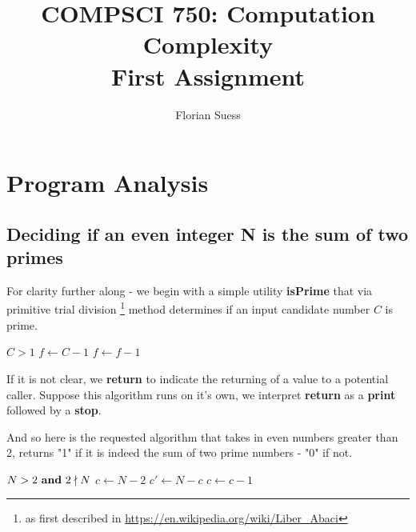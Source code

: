 \documentclass{article}
\title{COMPSCI 750: Computation Complexity \\ First Assignment}
\author{Florian Suess}
\begin{document}
\maketitle
\section{Program Analysis}
\subsection{Deciding if an even integer N is the sum of two primes}
For clarity further along - we begin with a simple utility \textbf{isPrime} that via primitive trial division \footnote{as first described in \url{https://en.wikipedia.org/wiki/Liber_Abaci}} method determines if an input candidate number $C$ is prime.

\vspace{1em}
\begin{algorithmic}[1]
	\REQUIRE $C > 1$
	\STATE $f \leftarrow C - 1$
		\ENDIF
		\STATE $f \leftarrow f - 1$
	\ENDWHILE
\end{algorithmic}
\vspace{1em}

If it is not clear, we \textbf{return} to indicate the returning of a value to a potential caller. Suppose this algorithm runs on it's own, we interpret \textbf{return} as a \textbf{print} followed by a \textbf{stop}.

\pagebreak

And so here is the requested algorithm that takes in even numbers greater than 2, returns "1" if it is indeed the sum of two prime numbers - "0" if not.

\vspace{1em}
\begin{algorithmic}[1]
	\REQUIRE $N > 2 \text{ \textbf{and} } 2 \nmid N$
	\STATE $c \leftarrow N - 2$
			\STATE $c' \leftarrow N - c$
			\ENDIF
		\ENDIF
		\STATE $c \leftarrow c - 1$
	\ENDWHILE
\end{algorithmic}
\vspace{1em}
\end{document}

